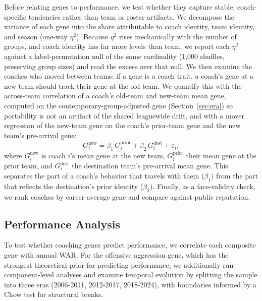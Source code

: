 \documentclass[USenglish]{article}
\theoremstyle{dgthm}
\theoremstyle{dgdef}
\begin{document}
Before relating genes to performance, we test whether they capture stable, coach-specific tendencies rather than team or roster artifacts. We decompose the variance of each gene into the share attributable to coach identity, team identity, and season (one-way $\eta^2$). Because $\eta^2$ rises mechanically with the number of groups, and coach identity has far more levels than team, we report each $\eta^2$ against a label-permutation null of the same cardinality (1{,}000 shuffles, preserving group sizes) and read the excess over that null. We then examine the coaches who moved between teams: if a gene is a coach trait, a coach's gene at a new team should track their gene at the old team. We quantify this with the across-team correlation of a coach's old-team and new-team mean gene, computed on the contemporary-group-adjusted gene (Section~\ref{sec:era}) so portability is not an artifact of the shared leaguewide drift, and with a mover regression of the new-team gene on the coach's prior-team gene and the new team's pre-arrival gene:
\begin{equation}
G^{\text{new}}_i = \beta_1\, G^{\text{prior}}_i + \beta_2\, G^{\text{dest}}_i + \varepsilon_i,
\end{equation}
where $G^{\text{new}}_i$ is coach $i$'s mean gene at the new team, $G^{\text{prior}}_i$ their mean gene at the prior team, and $G^{\text{dest}}_i$ the destination team's pre-arrival mean gene. This separates the part of a coach's behavior that travels with them ($\beta_1$) from the part that reflects the destination's prior identity ($\beta_2$). Finally, as a face-validity check, we rank coaches by career-average gene and compare against public reputation.

\subsection{Performance Analysis}

To test whether coaching genes predict performance, we correlate each composite gene with annual WAR. For the offensive aggression gene, which has the strongest theoretical prior for predicting performance, we additionally run component-level analyses and examine temporal evolution by splitting the sample into three eras (2006-2011, 2012-2017, 2018-2024), with boundaries informed by a Chow test for structural breaks.
\end{document}

